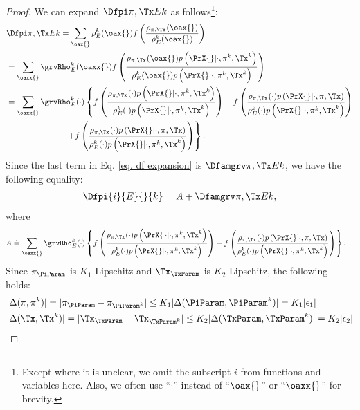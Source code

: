 \begin{proof}
\newcommand{\rhoPikTx}[1]{\rho_{\pi^{#1}, \Tx^k}}
\newcommand{\rhoPiTxk}[1]{\rho_{\pi, \Tx^{#1}}}
\newcommand{\rhoPiTxNon}{\rho_{\pi,\Tx}}
\newcommand{\qPrX}[1]{p\left({\PrX{}}|\cdot, #1\right)}
\newcommand{\rhoEoaxx}[1]{\rho_E^k(#1)\qPrX{\pi^k, \Tx^k}}
\newcommand{\deltapi}{\delta_1}
\newcommand{\deltatx}{\delta_2}
    We can expand $\Dfpilemma{}$ as follows\footnote{Except where it is unclear, we omit the subscript $i$ from functions and variables here. Also, we often use ``$\cdot$'' instead of ``$\oax{}$'' or ``$\oaxx{}$'' for brevity.}:
    \begin{align}
        &\Dfpilemma{} = \sum_{\oax{}}\rho_E^k(\oax{}) f\left(\frac{\rhoPiTxk{}(\oax{})}{\rho_E^k(\oax{})} \right) \nonumber \\
        &= \sum_{\oaxx{}}\grvRho_E^k(\oaxx{}) f\left(\frac{\rhoPiTxk{}(\oax{})\qPrX{\pi^k, \Tx^k}}{\rhoEoaxx{\oax{}}} \right) \nonumber\\
        &= \sum_{\oaxx{}}\grvRho_E^k(\cdot) \left\{
        f\left(\frac{\rhoPiTxk{}(\cdot)\qPrX{\pi^k, \Tx^k}}{\rhoEoaxx{\cdot}}\right)
        - f\left(\frac{\rhoPiTxk{}(\cdot)\qPrX{\pi, \Tx}}{\rhoEoaxx{\cdot}}\right)
        \right. \nonumber\\
        &\hspace{17ex}\left.
        + f\left(\frac{\rhoPiTxk{}(\cdot)\qPrX{\pi, \Tx}}{\rhoEoaxx{\cdot}}\right)
        \right\}. \label{eq. df expansion}
    \end{align}
    Since the last term in Eq. \ref{eq. df expansion} is $\Dfamlemma{}$, we have the following equality:
    \begin{align}
        \Dfpi{i}{E}{}{k} =A + \Dfamlemma{}, \label{eq. df relationship}
    \end{align}
    where
    \begin{align}
        A &\doteq \sum_{\oaxx{}}\grvRho_E^k(\cdot) \left\{f\left(\frac{\rhoPiTxk{}(\cdot)\qPrX{\pi^k, \Tx^{k}}}{\rhoEoaxx{\cdot}}\right)
        - f\left(\frac{\rhoPiTxk{}(\cdot)\qPrX{\pi, \Tx}}{\rhoEoaxx{\cdot}}\right)\right\}.
    \end{align}
    Since $\pi_\PiParam$ is $K_1$-Lipschitz and $\Tx_\TxParam$ is $K_2$-Lipschitz, the following holds:
    \begin{align}
        &|\Delta (\pi, \pi^k)| = |\pi_\PiParam - \pi_{\PiParam^k}| \leq K_1 |\Delta(\PiParam, \PiParam^k)| = K_1 |\epsilon_1| \label{eq. pi lipschitz}\\
        &|\Delta (\Tx, \Tx^k)| = |\Tx_\TxParam - \Tx_{\TxParam^k}| \leq K_2 |\Delta(\TxParam, \TxParam^k)| = K_2 |\epsilon_2| \label{eq. tx lipschitz}

\end{align}
\end{proof}
